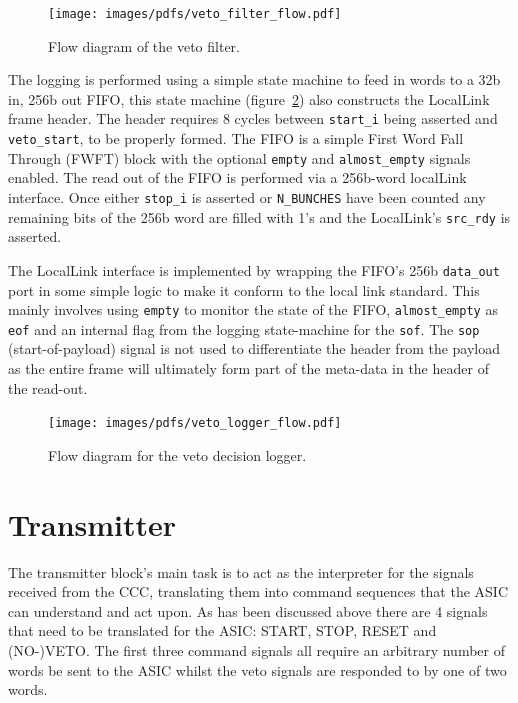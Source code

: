 \begin{figure}[htbp]
  \centering
  \texttt{[image: images/pdfs/veto\_filter\_flow.pdf]}
  \caption{Flow diagram of the veto filter.}
  \label{fig:veto_filter_flow}
\end{figure}
    
The logging is performed using a simple state machine to feed in words to a 32b in, 256b out FIFO, this state machine (figure~\ref{fig:veto_logger_flow}) also constructs the LocalLink frame header. The header requires 8 cycles between \texttt{start\_i} being asserted and \texttt{veto\_start}, to be properly formed. The FIFO is a simple First Word Fall Through (FWFT) block with the optional \texttt{empty} and \texttt{almost\_empty} signals enabled. The read out of the FIFO is performed via a 256b-word localLink interface. Once either \texttt{stop\_i} is asserted or \texttt{N\_BUNCHES} have been counted any remaining bits of the 256b word are filled with 1's and the LocalLink's \texttt{src\_rdy} is asserted. 
    
The LocalLink interface is implemented by wrapping the FIFO's 256b \texttt{data\_out} port in some simple logic to make it conform to the local link standard. This mainly involves using \texttt{empty} to monitor the state of the FIFO, \texttt{almost\_empty} as \texttt{eof} and an internal flag from the logging state-machine for the \texttt{sof}. The \texttt{sop} (start-of-payload) signal is not used to differentiate the header from the payload as the entire frame will ultimately form part of the meta-data in the header of the read-out.
    
\begin{figure}[htbp]
  \centering
  \texttt{[image: images/pdfs/veto\_logger\_flow.pdf]}
  \caption{Flow diagram for the veto decision logger.}
  \label{fig:veto_logger_flow}
\end{figure}

\section{Transmitter} %
\label{cha:transmitter}
The transmitter block's main task is to act as the interpreter for the signals received from the CCC, translating them into command sequences that the ASIC can understand and act upon. As has been discussed above there are 4 signals that need to be translated for the ASIC: START, STOP, RESET and (NO-)VETO. The first three command signals all require an arbitrary number of words be sent to the ASIC whilst the veto signals are responded to by one of two words.
    
